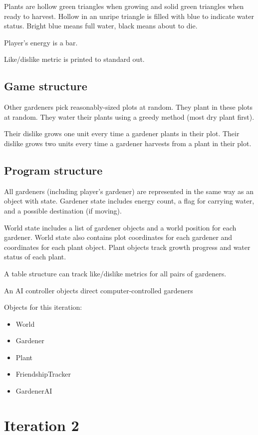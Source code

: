 \documentclass[12pt]{article}
\begin{document}
Plants are hollow green triangles when growing and solid green triangles when ready to harvest.
Hollow in an unripe triangle is filled with blue to indicate water status.
Bright blue means full water, black means about to die.

Player's energy is a bar.

Like/dislike metric is printed to standard out.


\subsection{Game structure}

Other gardeners pick reasonably-sized plots at random.  
They plant in these plots at random.
They water their plants using a greedy method (most dry plant first).

Their dislike grows one unit every time a gardener plants in their plot.
Their dislike grows two units every time a gardener harvests from a plant in their plot.

\subsection{Program structure}
 
All gardeners (including player's gardener) are represented in the same way as an object with state.
Gardener state includes energy count, a flag for carrying water, and a possible destination (if moving).

World state includes a list of gardener objects and a world position for each gardener.
World state also contains plot coordinates for each gardener and coordinates for each plant object.
Plant objects track growth progress and water status of each plant.
 
A table structure can track like/dislike metrics for all pairs of gardeners.

An AI controller objects direct computer-controlled gardeners


Objects for this iteration:
\begin{itemize}
\item World
\item Gardener
\item Plant
\item FriendshipTracker
\item GardenerAI
\end{itemize}




\section{Iteration 2}
\end{document}
